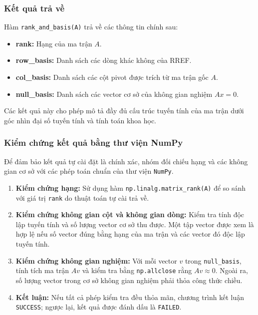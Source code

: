 \documentclass[12pt,a4paper]{article}
\begin{document}
\subsubsection{Kết quả trả về}
\begin{infobox}
Hàm \texttt{rank\_and\_basis(A)} trả về các thông tin chính sau:
\begin{itemize}[leftmargin=1.5em]
    \item \textbf{rank:} Hạng của ma trận $A$.
    \item \textbf{row\_basis:} Danh sách các dòng khác không của RREF.
    \item \textbf{col\_basis:} Danh sách các cột pivot được trích từ ma trận gốc $A$.
    \item \textbf{null\_basis:} Danh sách các vector cơ sở của không gian nghiệm $Ax = 0$.
\end{itemize}
Các kết quả này cho phép mô tả đầy đủ cấu trúc tuyến tính của ma trận dưới góc nhìn đại số tuyến tính và tính toán khoa học.
\end{infobox}

\subsubsection{Kiểm chứng kết quả bằng thư viện NumPy}
Để đảm bảo kết quả tự cài đặt là chính xác, nhóm đối chiếu hạng và các không gian cơ sở với các phép toán chuẩn của thư viện \texttt{NumPy}.

\begin{enumerate}[label=\textbf{\alph*)}, leftmargin=*, align=left]
    \item \textbf{Kiểm chứng hạng:} Sử dụng hàm \texttt{np.linalg.matrix\_rank(A)} để so sánh với giá trị \texttt{rank} do thuật toán tự cài trả về.

    \item \textbf{Kiểm chứng không gian cột và không gian dòng:} Kiểm tra tính độc lập tuyến tính và số lượng vector cơ sở thu được. Một tập vector được xem là hợp lệ nếu số vector đúng bằng hạng của ma trận và các vector đó độc lập tuyến tính.

    \item \textbf{Kiểm chứng không gian nghiệm:} Với mỗi vector $v$ trong \texttt{null\_basis}, tính tích ma trận $Av$ và kiểm tra bằng \texttt{np.allclose} rằng $Av \approx 0$. Ngoài ra, số lượng vector trong cơ sở không gian nghiệm phải thỏa công thức chiều.

    \item \textbf{Kết luận:} Nếu tất cả phép kiểm tra đều thỏa mãn, chương trình kết luận \texttt{SUCCESS}; ngược lại, kết quả được đánh dấu là \texttt{FAILED}.
\end{enumerate}
\end{document}
